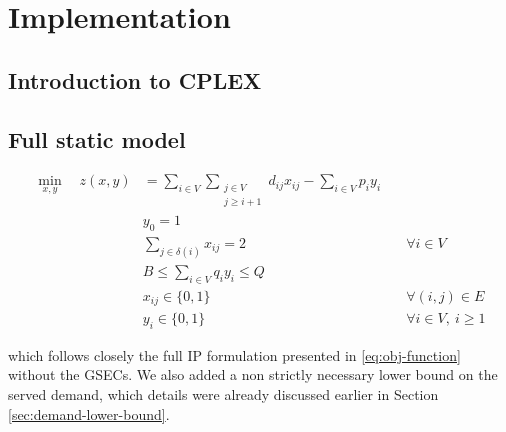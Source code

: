 \chapter{Implementation}


\section{Introduction to CPLEX}



\section{Full static model}

\begin{align}
	\min_{x,y} \quad z(x, y) & =  \sum_{i \in V} \sum_{\substack{j \in V                                                                                                   \\ j \ge i + 1}} d_{ij} x_{ij} - \sum_{i \in V} p_i y_i \label{eq:obj-function}\\
	                         & y_0 = 1                                           & \label{eq:full-static-model-depot-part-of-tour-constraint}                              \\
	                         & \sum_{j \in \delta(i)}       x_{ij}    = 2        & \quad \forall i \in V         \label{eq:full-static-model-flow-conservation-constraint} \\
	                         & B \le   \sum_{i \in V} q_i y_i   \le Q            & \label{eq:full-static-model-resource-upper-bound-constraint}                            \\
	                         & x_{ij}                   \in \lbrace 0, 1 \rbrace & \quad \forall (i, j) \in E               \label{eq:full-static-model-x-mip-var-bounds}  \\
	                         & y_{i}                    \in \lbrace 0, 1 \rbrace & \quad \forall i \in V,\ i \ge 1          \label{eq:full-static-model-y-mip-var-bounds}
\end{align}

which follows closely the full IP formulation presented in \eqref{eq:obj-function} without the GSECs.
We also added a non strictly necessary lower bound on the served demand, which details were already discussed earlier in Section \ref{sec:demand-lower-bound}.

